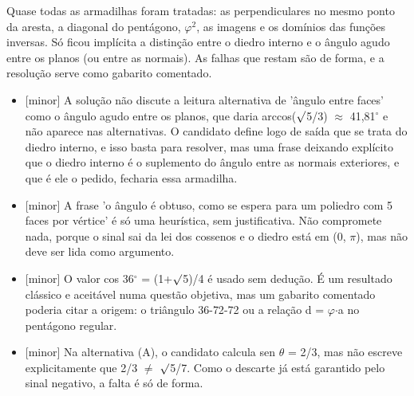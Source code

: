 \documentclass{article}%
\begin{document}
\newline%
Quase todas as armadilhas foram tratadas: as perpendiculares no mesmo ponto da aresta, a diagonal do pentágono, $\varphi$$^2$, as imagens e os domínios das funções inversas. Só ficou implícita a distinção entre o diedro interno e o ângulo agudo entre os planos (ou entre as normais). As falhas que restam são de forma, e a resolução serve como gabarito comentado.%
\begin{itemize}%
\item%
{[}minor{]} A solução não discute a leitura alternativa de 'ângulo entre faces' como o ângulo agudo entre os planos, que daria arccos($\surd$5/3) $\approx$ 41,81$^\circ$ e não aparece nas alternativas. O candidato define logo de saída que se trata do diedro interno, e isso basta para resolver, mas uma frase deixando explícito que o diedro interno é o suplemento do ângulo entre as normais exteriores, e que é ele o pedido, fecharia essa armadilha.%
\item%
{[}minor{]} A frase 'o ângulo é obtuso, como se espera para um poliedro com 5 faces por vértice' é só uma heurística, sem justificativa. Não compromete nada, porque o sinal sai da lei dos cossenos e o diedro está em (0, $\pi$), mas não deve ser lida como argumento.%
\item%
{[}minor{]} O valor cos 36$^\circ$ = (1+$\surd$5)/4 é usado sem dedução. É um resultado clássico e aceitável numa questão objetiva, mas um gabarito comentado poderia citar a origem: o triângulo 36{-}72{-}72 ou a relação d = $\varphi$$\cdot$a no pentágono regular.%
\item%
{[}minor{]} Na alternativa (A), o candidato calcula sen $\theta$ = 2/3, mas não escreve explicitamente que 2/3 $\neq$ $\surd$5/7. Como o descarte já está garantido pelo sinal negativo, a falta é só de forma.%
\end{itemize}%
\end{document}
